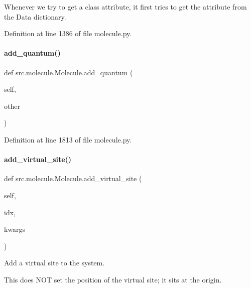 Whenever we try to get a class attribute, it first tries to get the attribute from the Data dictionary. 



Definition at line 1386 of file molecule.\+py.

\mbox{\label{classsrc_1_1molecule_1_1Molecule_ab863d592cf9369137d6298eb005556c9}} 
\paragraph{\texorpdfstring{add\+\_\+quantum()}{add\_quantum()}}
{\footnotesize\ttfamily def src.\+molecule.\+Molecule.\+add\+\_\+quantum (\begin{DoxyParamCaption}\item[{}]{self,  }\item[{}]{other }\end{DoxyParamCaption})}



Definition at line 1813 of file molecule.\+py.

\mbox{\label{classsrc_1_1molecule_1_1Molecule_afa69c71616ba48c2641d3e2b5914b6d9}} 
\paragraph{\texorpdfstring{add\+\_\+virtual\+\_\+site()}{add\_virtual\_site()}}
{\footnotesize\ttfamily def src.\+molecule.\+Molecule.\+add\+\_\+virtual\+\_\+site (\begin{DoxyParamCaption}\item[{}]{self,  }\item[{}]{idx,  }\item[{}]{kwargs }\end{DoxyParamCaption})}



Add a virtual site to the system. 

This does N\+OT set the position of the virtual site; it sits at the origin. 

